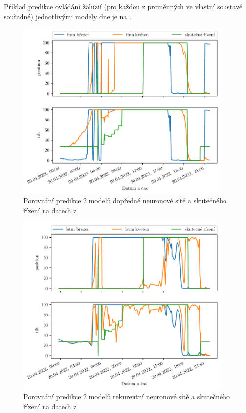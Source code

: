     Příklad predikce ovládání žaluzií (pro každou z proměnných ve vlastní soustavě souřadné) jednotlivými modely dne  je na .
    \begin{figure}[H]
        \centering
        \includegraphics[draft=false,width=0.95\textwidth]{img/results/retraining_sel_ffnn.pdf}
        \caption[Porovnání predikce FFNN (retraining)]{Porovnání predikce 2 modelů dopředné neuronové sítě a skutečného řízení na datech z }
        \label{fig:retr_ffnn}
    \end{figure}
    \begin{figure}[H]
        \centering
        \includegraphics[draft=false,width=0.95\textwidth]{img/results/retraining_sel_lstm.pdf}
        \caption[Porovnání predikce LSTM (retraining)]{Porovnání predikce 2 modelů rekurentní neuronové sítě a skutečného řízení na datech z }
        \label{fig:retr_lstm}
    \end{figure}